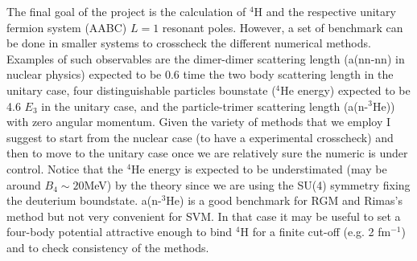 \documentclass[aps,onecolumn,preprintnumbers,amsmath,amssymb,nofootinbib,superscriptaddress,notitlepage]{revtex4-1}
\begin{document}
The final goal of the project is the calculation of $^4$H and the respective unitary fermion system (AABC) $L=1$ resonant poles.
However, a set of benchmark can be done in smaller systems to crosscheck the different numerical methods.
Examples of such observables are the dimer-dimer scattering length (a(nn-nn) in nuclear physics) expected to be 0.6 time the two body scattering length in the unitary case, four distinguishable particles bounstate ($^4$He energy) expected to be 4.6 $E_3$ in the unitary case, and the particle-trimer scattering length (a(n-$^3$He)) with zero angular momentum.
Given the variety of methods that we employ I suggest to start from the nuclear case (to have a experimental crosscheck) and then to move to the unitary case once we are relatively sure the numeric is under control. 
Notice that the $^4$He energy is expected to be understimated (may be around $B_4\sim 20$MeV) by the theory since we are using the SU(4) symmetry fixing the deuterium boundstate. 
a(n-$^3$He) is a good benchmark for RGM and Rimas's method but not very convenient for SVM. In that case it may be useful to set a four-body potential attractive enough to bind $^4$H for a finite cut-off (e.g. 2 fm$^{-1}$) and to check consistency of the methods.
\end{document}
